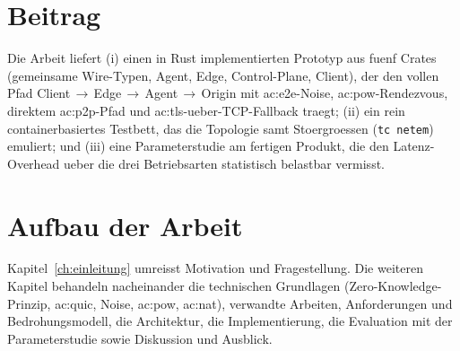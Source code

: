 \section{Beitrag}
\label{sec:beitrag}

Die Arbeit liefert (i) einen in Rust implementierten Prototyp aus fuenf Crates
(gemeinsame Wire-Typen, Agent, Edge, Control-Plane, Client), der den vollen
Pfad Client\,$\rightarrow$\,Edge\,$\rightarrow$\,Agent\,$\rightarrow$\,Origin
mit \gls{ac:e2e}-Noise, \gls{ac:pow}-Rendezvous, direktem \gls{ac:p2p}-Pfad und
\gls{ac:tls}-ueber-TCP-Fallback traegt; (ii) ein rein containerbasiertes
Testbett, das die Topologie samt Stoergroessen (\texttt{tc netem}) emuliert; und
(iii) eine Parameterstudie am fertigen Produkt, die den Latenz-Overhead ueber
die drei Betriebsarten statistisch belastbar vermisst.

\section{Aufbau der Arbeit}
\label{sec:aufbau}

Kapitel~\ref{ch:einleitung} umreisst Motivation und Fragestellung.
Die weiteren Kapitel behandeln nacheinander die technischen Grundlagen
(Zero-Knowledge-Prinzip, \gls{ac:quic}, Noise, \gls{ac:pow}, \gls{ac:nat}),
verwandte Arbeiten, Anforderungen und Bedrohungsmodell, die Architektur, die
Implementierung, die Evaluation mit der Parameterstudie sowie Diskussion und
Ausblick.
